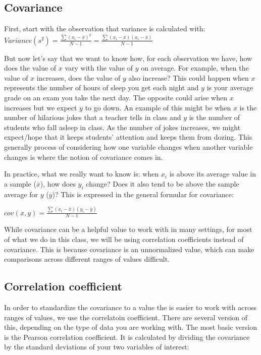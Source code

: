 \documentclass[
]{book}
\begin{document}
\hypertarget{covariance}{%
\subsection{Covariance}\label{covariance}}

First, start with the observation that variance is calculated with:
\(Variance(s^2) = \frac{\sum(x_i - \overline{x})^2}{N - 1} = \frac{\sum(x_i - \overline{x})(x_i - \overline{x})}{N - 1}\)

But now let's say that we want to know how, for each observation we have, how does the value of \(x\) vary with the value of \(y\) on average. For example, when the value of \(x\) increases, does the value of \(y\) also increase? This could happen when \(x\) represents the number of hours of sleep you get each night and \(y\) is your average grade on an exam you take the next day. The opposite could arise when \(x\) increases but we expect \(y\) to go down. An example of this might be when \(x\) is the number of hilarious jokes that a teacher tells in class and \(y\) is the number of students who fall asleep in class. As the number of jokes increases, we might expect/hope that it keeps students' attention and keeps them from dozing. This generally process of considering how one variable changes when another variable changes is where the notion of covariance comes in.

In practice, what we really want to know is: when \(x_i\) is above its average value in a sample (\(\overline{x}\)), how does \(y_i\) change? Does it also tend to be above the sample average for \(y\) (\(\overline{y}\))? This is expressed in the general formular for covariance:

\(cov(x,y) = \frac{\sum(x_i - \overline{x})(y_i - \overline{y})}{N - 1}\)

While covariance can be a helpful value to work with in many settings, for most of what we do in this class, we will be using correlation coefficients instead of covariance. This is because covariance is an unnormalized value, which can make comparisons across different ranges of values difficult.

\hypertarget{correlation-coefficient}{%
\subsection{Correlation coefficient}\label{correlation-coefficient}}

In order to standardize the covariance to a value the is easier to work with across ranges of values, we use the correlatoin coefficient. There are several version of this, depending on the type of data you are working with. The most basic version is the Pearson correlation coefficient. It is calculated by dividing the covariance by the standard deviations of your two variables of interest:
\end{document}
